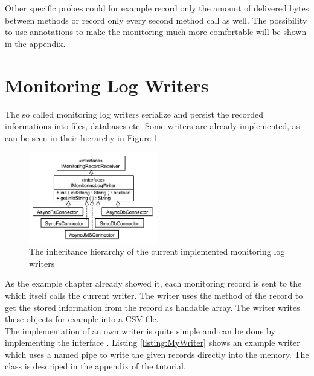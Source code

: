 

\noindent Other specific probes could for example record only the amount of delivered bytes between methods or record only every second method call as well. The possibility to use annotations to make the monitoring much more comfortable will be shown in the appendix.

\section{Monitoring Log Writers}\label{sec:monitoring-log-writers}

		The so called monitoring log writers serialize and persist the recorded informations into files, databases etc. %
		Some writers are already implemented, as can be seen in their hierarchy in Figure \ref{figure:monitoringLogWritersHierarchy}.

		\begin{figure}[H]
			\begin{centering}
				\includegraphics[width=0.5\textwidth]{images/kieker_writerimpls}
				\caption{The inheritance hierarchy of the current implemented monitoring log writers}
				\label{figure:monitoringLogWritersHierarchy}
			\end{centering}
		\end{figure}


		\noindent As the example chapter already showed it, each monitoring record is sent to the  which itself calls the current writer. The writer uses the  method of the record to get the stored information from the record as handable array. The writer writes these objects for example into a CSV file.\\
		The implementation of an own writer is quite simple and can be done by implementing the interface . Listing \ref{listing:MyWriter} shows an example writer which uses a named pipe to write the given records directly into the memory. The class  is descriped in the appendix of the tutorial. 


